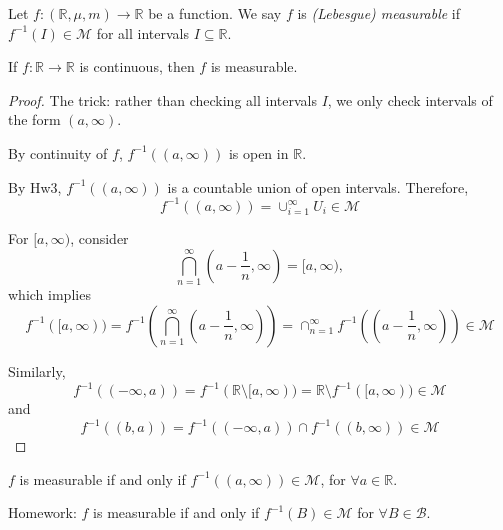 \begin{definition}[Measurable]
Let $f:(\mathbb{R},\mu,m)\to\mathbb{R}$ be a function.
We say $f$ is \emph{(Lebesgue) measurable} if $f^{-1}(I)\in\mathcal{M}$ for all intervals $I\subseteq\mathbb{R}$.
\end{definition}

\begin{proposition}
If $f:\mathbb{R}\to\mathbb{R}$ is continuous, then $f$ is measurable.
\end{proposition}
\begin{proof}
The trick: rather than checking all intervals $I$, we only check intervals of the form $(a,\infty)$.

By continuity of $f$, $f^{-1}((a,\infty))$ is open in $\mathbb{R}$.

By Hw3, $f^{-1}((a,\infty))$ is a countable union of open intervals.
Therefore,
\[
f^{-1}((a,\infty))=\cup_{i=1}^\infty U_i\in\mathcal{M}
\]

For $[a,\infty)$, consider
\[
\bigcap_{n=1}^\infty(a-\frac{1}{n},\infty)=[a,\infty),
\]
which implies
\[
f^{-1}([a,\infty)) = f^{-1}(\bigcap_{n=1}^\infty(a-\frac{1}{n},\infty))
=
\cap_{n=1}^\infty f^{-1}((a-\frac{1}{n},\infty))\in\mathcal{M}
\]

Similarly, 
\[
f^{-1}((-\infty,a))=f^{-1}(\mathbb{R}\setminus[a,\infty))
=
\mathbb{R}\setminus f^{-1}([a,\infty))\in\mathcal{M}
\]
and
\[
f^{-1}((b,a))=f^{-1}((-\infty,a))\cap f^{-1}((b,\infty))\in\mathcal{M}
\]

\end{proof}
\begin{remark}
$f$ is measurable if and only if $f^{-1}((a,\infty))\in\mathcal{M}$, for $\forall a\in\mathbb{R}$.

Homework: $f$ is measurable if and only if $f^{-1}(B)\in\mathcal{M}$ for $\forall B\in\mathcal{B}$.
\end{remark}

